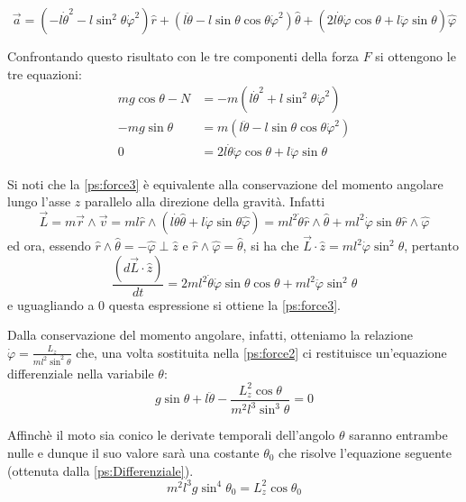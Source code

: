 \documentclass[../main.tex]{subfiles}
\begin{document}
$$\vec{a}=(-l\dot{\theta}^2-l\sin^2{\theta}\dot{\varphi}^2)\hat{r}+(l\ddot{\theta}-l\sin\theta\cos\theta\dot{\varphi}^2)\hat{\theta}+(2l\dot{\theta}\dot{\varphi}\cos\theta+l\ddot{\varphi}\sin\theta)\hat{\varphi}$$


Confrontando questo risultato con le tre componenti della forza $F$ si ottengono le tre equazioni:
\begin{align}
 mg\cos\theta -N & =-m(l\dot{\theta}^2+l\sin^2\theta\dot{\varphi}^2) \label{ps:force1} \\
 -mg\sin\theta & =m(l\ddot{\theta}-l\sin\theta\cos\theta\dot{\varphi}^2) \label{ps:force2} \\
 0 & =2l\dot{\theta}\dot{\varphi}\cos\theta+l\ddot{\varphi}\sin\theta \label{ps:force3}
\end{align}

Si noti che la \cref{ps:force3} \`e equivalente alla conservazione del momento angolare lungo l'asse $z$ parallelo alla direzione della gravit\`a. Infatti 
\begin{equation*}
 \vec{L}=m\vec{r}\wedge\vec{v}=ml\hat{r}\wedge(l\dot{\theta}\hat{\theta}+l\dot{\varphi}\sin\theta\hat{\varphi})=ml^2\dot{\theta}\hat{r}\wedge\hat{\theta}+ml^2\dot{\varphi}\sin\theta\hat{r}\wedge\hat{\varphi}
\end{equation*}
ed ora, essendo $\hat{r}\wedge\hat{\theta}=-\hat{\varphi}\perp\hat{z}$ e $\hat{r}\wedge\hat{\varphi}=\hat{\theta}$, si ha che
$\vec{L}\cdot\hat{z}=ml^2\dot{\varphi}\sin^2\theta$, pertanto 
\begin{equation*}
 \frac{(d\vec{L}\cdot\hat{z})}{dt}=2ml^2\dot{\theta}\dot{\varphi}\sin\theta\cos\theta+ml^2\ddot{\varphi}\sin^2\theta
\end{equation*}
e uguagliando a 0 questa espressione si ottiene la \cref{ps:force3}.

Dalla conservazione del momento angolare, infatti, otteniamo la relazione $\displaystyle \dot{\varphi}=\frac{L_z}{ml^2\sin^2\theta}$ che, una volta sostituita nella \cref{ps:force2} ci restituisce un'equazione differenziale nella variabile $\theta$:
\begin{equation}\label{ps:Differenziale}
g\sin\theta+l\ddot{\theta}-\frac{L_z^2\cos\theta}{m^2l^3\sin^3\theta}=0
\end{equation}

Affinch\`e il moto sia conico le derivate temporali dell'angolo $\theta$ saranno entrambe nulle e dunque il suo valore sar\`a una costante $\theta_0$ che risolve l'equazione seguente (ottenuta dalla \cref{ps:Differenziale}).
\begin{equation}\label{ps:MotoConico}
m^2l^3g\sin^4\theta_0=L_z^2\cos\theta_0
\end{equation}
\end{document}
